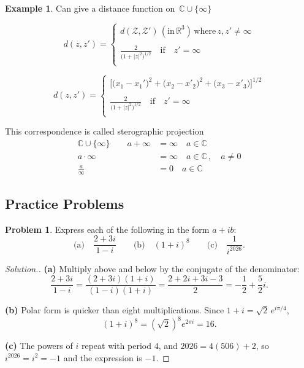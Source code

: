 \documentclass[11pt,a4paper]{article}
\theoremstyle{definition}
\newtheorem{example}[thm]{Example}
\newtheorem{problemx}{Problem}[section]
\newenvironment{problem}{\begin{problemx}}{\end{problemx}}
\newenvironment{solution}
  {\renewcommand{\qedsymbol}{}\begin{proof}[\textit{Solution}.]}
  {\end{proof}}
\begin{document}
\begin{example}
Can give a distance function on $\, \mathbb{C}\cup \{\infty\}$


$$d(z,z') = \begin{cases}
d(\mathcal{Z},\mathcal{Z}')\, (\text{in}\,\mathbb{R}^3)\,\text{where}\,z,z' \neq \infty\\\\
\frac{2}{\Big(1 + \left|z\right|^2\Big)^{1/2}}\quad \text{if}\quad z' = \infty\\
\end{cases}
$$


$$d(z,z') = \begin{cases}
\Big[\big(x_1 -x_1'\big)^2 + \big(x_2 - x'_2\big)^2 + \big(x_3 - x'_3\big)\Big]^{1/2}\\\\
\frac{2}{\Big(1 + \left|z\right|^2\Big)^{1/2}}\quad \text{if}\quad z' = \infty\\
\end{cases}
$$















This correspondence is called sterographic projection\\

\begin{align*}
\mathbb{C}\cup \{\infty\}\qquad  a + \infty & = \infty\quad  a\in \mathbb{C}\\
a\cdot \infty & = \infty \quad  a\in \mathbb{C}\,,\quad  a\neq 0\\
\frac{a}{\infty} & = 0\quad  a\in \mathbb{C}
\end{align*}
\end{example}

{\color[wave]{485}\subsection{Practice Problems}}

\begin{problem}
Express each of the following in the form $a+ib$:
$$\text{(a)}\quad \frac{2+3i}{1-i}\qquad
\text{(b)}\quad (1+i)^{8}\qquad
\text{(c)}\quad \frac{1}{i^{2026}} .$$
\end{problem}
\begin{solution}
\textbf{(a)} Multiply above and below by the conjugate of the denominator:
$$\frac{2+3i}{1-i}=\frac{(2+3i)(1+i)}{(1-i)(1+i)}
=\frac{2+2i+3i-3}{2}=-\frac{1}{2}+\frac{5}{2}i .$$

\textbf{(b)} Polar form is quicker than eight multiplications. Since
$1+i=\sqrt2\,e^{i\pi/4}$,
$$(1+i)^{8}=\left(\sqrt2\right)^{8}e^{2\pi i}=16 .$$

\textbf{(c)} The powers of $i$ repeat with period $4$, and $2026=4(506)+2$, so
$i^{2026}=i^{2}=-1$ and the expression is $-1$.
\end{solution}
\end{document}
